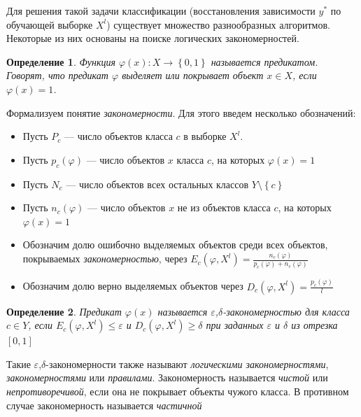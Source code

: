 \documentclass[12pt]{article}
\newtheorem{definition}{Определение}
\begin{document}
Для решения такой задачи классификации (восстановления зависимости
\(y^{*}\) по обучающей выборке \(X^l\)) существует множество
разнообразных алгоритмов. Некоторые из них основаны на поиске
логических закономерностей.

\begin{definition}
  Функция \(\varphi(x) \colon X \rightarrow \left\{0, 1\right\}\)
  называется \emph{предикатом}. Говорят, что предикат
  \(\varphi\) \emph{выделяет} или \emph{покрывает} объект \(x \in X\),
  если \(\varphi(x) = 1\).
\end{definition}

Формализуем понятие \emph{закономерности}. Для этого введем несколько
обозначений:

\begin{itemize}
\item Пусть \(P_c\) --- число объектов класса \(c\) в выборке \(X^l\).
\item Пусть \(p_c(\varphi)\) --- число объектов \(x\) класса \(c\), на
  которых \(\varphi(x) = 1\)
\item Пусть \(N_c\) --- число объектов всех остальных классов \(Y
  \setminus \left\{c\right\}\)
\item Пусть \(n_c(\varphi)\) --- число объектов \(x\) не из объектов
  класса \(c\), на которых \(\varphi(x) = 1\)
\item Обозначим долю ошибочно выделяемых объектов среди всех объектов,
  покрываемых \emph{закономерностью}, через \(E_c(\varphi, X^l) =
  \frac{n_c(\varphi)}{p_c(\varphi) + n_c(\varphi)}\)
\item Обозначим долю верно выделяемых объектов через \(D_c(\varphi,
  X^l) = \frac{p_c(\varphi)}{l}\)
\end{itemize}

\begin{definition}
  Предикат \(\varphi(x)\) называется
  \emph{\(\varepsilon\),\(\delta\)-закономерностью} для класса \(c \in
  Y\), если \(E_c(\varphi, X^l) \leq \varepsilon \) и \(D_c(\varphi,
  X^l)\geq\delta\) при заданных \(\varepsilon\) и \(\delta\) из
  отрезка \([0, 1]\)
\end{definition}

Такие \(\varepsilon\),\(\delta\)-закономерности также называют
\emph{логическими закономерностями}, \emph{закономерностями} или
\emph{правилами}. Закономерность называется \emph{чистой} или
\emph{непротиворечивой}, если она не покрывает объекты чужого
класса. В противном случае закономерность называется \emph{частичной}
\end{document}
